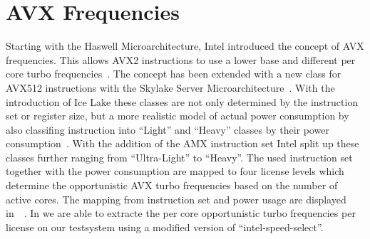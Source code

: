 \section{AVX Frequencies}
\label{sec:avx-frequencies}

Starting with the Haswell Microarchitecture, Intel introduced the concept of AVX frequencies.
This allows AVX2 instructions to use a lower base and different per core turbo frequencies~\cite{Hackenberg_2015_Haswell}.
The concept has been extended with a new class for AVX512 instructions with the Skylake Server Microarchitecture~\cite[Sec. 2.6.3]{Intel_Optimization_Reference_Manual_050}.
With the introduction of Ice Lake these classes are not only determined by the instruction set or register size, but a more realistic model of actual power consumption by also classifing instruction into ``Light'' and ``Heavy'' classes by their power consumption~\cite{papazian_new_2020}.
With the addition of the AMX instruction set Intel split up these classes further ranging from ``Ultra-Light'' to ``Heavy''.
The used instruction set together with the power consumption are mapped to four license levels which determine the opportunistic AVX turbo frequencies based on the number of active cores.
The mapping from instruction set and power usage are displayed in~~\cite{ServeTheHome_Emerald_Rapids_2023}.
In  we are able to extracte the per core opportunistic turbo frequencies per license on our testsystem using a modified version of ``intel-speed-select''.


